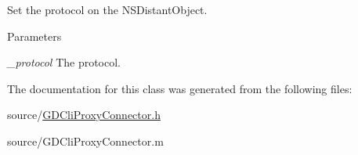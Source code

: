 Set the protocol on the NSDistantObject. 
\begin{DoxyParams}{Parameters}
\item[{\em \_\-protocol}]The protocol. \end{DoxyParams}


The documentation for this class was generated from the following files:\begin{DoxyCompactItemize}
\item 
source/\hyperlink{_g_d_cli_proxy_connector_8h}{GDCliProxyConnector.h}\item 
source/GDCliProxyConnector.m\end{DoxyCompactItemize}
